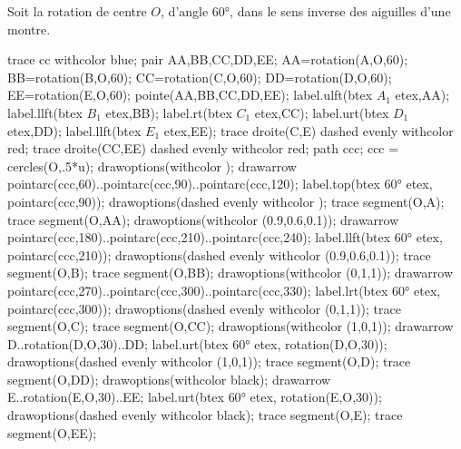 \begin{corrige}
    Soit la rotation de centre $O$, d'angle \ang{60}, dans le sens inverse des aiguilles d'une montre.

    \hspace*{-15mm}
    \begin{Geometrie}[CoinHD={(9u,7u)}]        
        \enonceTroisiemeGTroisExoTreize
        trace cc withcolor blue;
        pair AA,BB,CC,DD,EE;
        AA=rotation(A,O,60);
        BB=rotation(B,O,60);
        CC=rotation(C,O,60);
        DD=rotation(D,O,60);
        EE=rotation(E,O,60);
        pointe(AA,BB,CC,DD,EE);        
        label.ulft(btex $A_1$ etex,AA);
        label.llft(btex $B_1$ etex,BB);
        label.rt(btex $C_1$ etex,CC);
        label.urt(btex $D_1$ etex,DD);
        label.llft(btex $E_1$ etex,EE);
        trace droite(C,E) dashed evenly withcolor red;
        trace droite(CC,EE) dashed evenly withcolor red;
        path ccc;
        ccc = cercles(O,.5*u);
        drawoptions(withcolor \myMetapostGreen);
        drawarrow pointarc(ccc,60)..pointarc(ccc,90)..pointarc(ccc,120);
        label.top(btex $\ang{60}$ etex, pointarc(ccc,90));
        drawoptions(dashed evenly withcolor \myMetapostGreen);
        trace segment(O,A);
        trace segment(O,AA);
        drawoptions(withcolor (0.9,0.6,0.1));
        drawarrow pointarc(ccc,180)..pointarc(ccc,210)..pointarc(ccc,240);
        label.llft(btex $\ang{60}$ etex, pointarc(ccc,210));
        drawoptions(dashed evenly withcolor (0.9,0.6,0.1));
        trace segment(O,B);
        trace segment(O,BB);
        drawoptions(withcolor (0,1,1));
        drawarrow pointarc(ccc,270)..pointarc(ccc,300)..pointarc(ccc,330);
        label.lrt(btex $\ang{60}$ etex, pointarc(ccc,300));
        drawoptions(dashed evenly withcolor (0,1,1));
        trace segment(O,C);
        trace segment(O,CC);
        drawoptions(withcolor (1,0,1));
        drawarrow D..rotation(D,O,30)..DD;
        label.urt(btex $\ang{60}$ etex, rotation(D,O,30));
        drawoptions(dashed evenly withcolor (1,0,1));
        trace segment(O,D);
        trace segment(O,DD);
        drawoptions(withcolor black);
        drawarrow E..rotation(E,O,30)..EE;
        label.urt(btex $\ang{60}$ etex, rotation(E,O,30));
        drawoptions(dashed evenly withcolor black);
        trace segment(O,E);
        trace segment(O,EE);
    \end{Geometrie}


\end{corrige}
